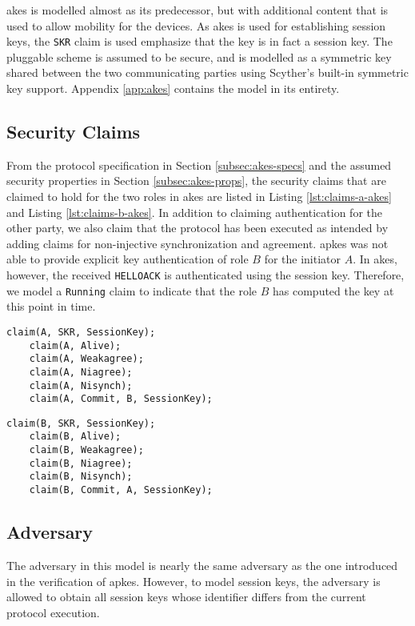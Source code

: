 \gls{akes} is modelled almost as its predecessor, but with additional content that is used to allow mobility for the devices. As \gls{akes} is used for establishing session keys, the \texttt{SKR} claim is used emphasize that the key is in fact a session key. The pluggable scheme is assumed to be secure, and is modelled as a symmetric key shared between the two communicating parties using Scyther's built-in symmetric key support. Appendix \ref{app:akes} contains the model in its entirety. 

\subsection{Security Claims}

From the protocol specification in Section \ref{subsec:akes-specs} and the assumed security properties in Section \ref{subsec:akes-props}, the security claims that are claimed to hold for the two roles in \gls{akes} are listed in Listing \ref{lst:claims-a-akes} and Listing \ref{lst:claims-b-akes}. In addition to claiming authentication for the other party, we also claim that the protocol has been executed as intended by adding claims for non-injective synchronization and agreement. \gls{apkes} was not able to provide explicit key authentication of role $B$ for the initiator $A$. In \gls{akes}, however, the received \texttt{HELLOACK} is authenticated using the session key. Therefore, we model a \texttt{Running} claim to indicate that the role $B$ has computed the key at this point in time.

\begin{lstlisting}[caption={Security claims for role A in AKES.}, label={lst:claims-a-akes}]
	claim(A, SKR, SessionKey);
	claim(A, Alive);
	claim(A, Weakagree);
	claim(A, Niagree);
	claim(A, Nisynch);
	claim(A, Commit, B, SessionKey);
\end{lstlisting}

\begin{lstlisting}[caption={Security claims for role B in AKES.}, label={lst:claims-b-akes}]
	claim(B, SKR, SessionKey);
	claim(B, Alive);
	claim(B, Weakagree);
	claim(B, Niagree);
	claim(B, Nisynch);
	claim(B, Commit, A, SessionKey);
\end{lstlisting}

\subsection{Adversary}

The adversary in this model is nearly the same adversary as the one introduced in the verification of \gls{apkes}. However, to model session keys, the adversary is allowed to obtain all session keys whose identifier differs from the current protocol execution. 
\newpage
